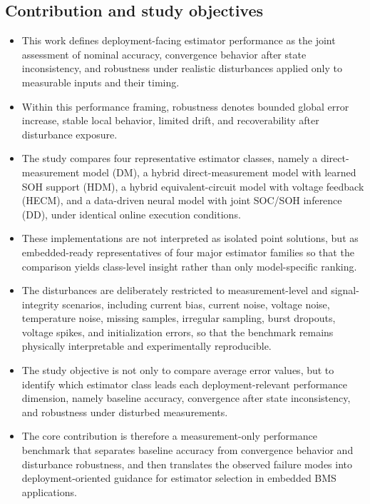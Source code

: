\documentclass[review]{elsarticle}
\begin{document}
\subsection{Contribution and study objectives}
\begin{itemize}[leftmargin=*]
    \item This work defines deployment-facing estimator performance as the joint assessment of nominal accuracy, convergence behavior after state inconsistency, and robustness under realistic disturbances applied only to measurable inputs and their timing.
    \item Within this performance framing, robustness denotes bounded global error increase, stable local behavior, limited drift, and recoverability after disturbance exposure.
    \item The study compares four representative estimator classes, namely a direct-measurement model (DM), a hybrid direct-measurement model with learned SOH support (HDM), a hybrid equivalent-circuit model with voltage feedback (HECM), and a data-driven neural model with joint SOC/SOH inference (DD), under identical online execution conditions.
    \item These implementations are not interpreted as isolated point solutions, but as embedded-ready representatives of four major estimator families so that the comparison yields class-level insight rather than only model-specific ranking.
    \item The disturbances are deliberately restricted to measurement-level and signal-integrity scenarios, including current bias, current noise, voltage noise, temperature noise, missing samples, irregular sampling, burst dropouts, voltage spikes, and initialization errors, so that the benchmark remains physically interpretable and experimentally reproducible.
    \item The study objective is not only to compare average error values, but to identify which estimator class leads each deployment-relevant performance dimension, namely baseline accuracy, convergence after state inconsistency, and robustness under disturbed measurements.
    \item The core contribution is therefore a measurement-only performance benchmark that separates baseline accuracy from convergence behavior and disturbance robustness, and then translates the observed failure modes into deployment-oriented guidance for estimator selection in embedded BMS applications.
\end{itemize}
\end{document}
